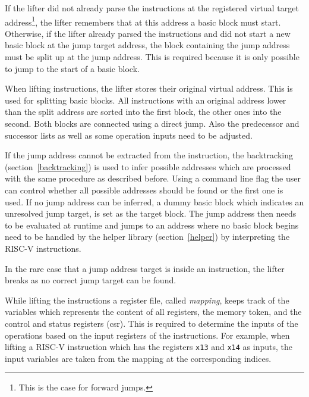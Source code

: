 \documentclass[course=eragp]{aspdoc}
\begin{document}
If the lifter did not already parse the instructions at the registered virtual target
address\footnote{This is the case for forward jumps.}, the
lifter remembers that at this address a basic block must start.
Otherwise, if the lifter already parsed the instructions and did not start a new basic block at the
jump target address, the block containing the jump address must be split up at the jump address.
This is required because it is only possible to jump to the start of a basic block.

\par

When lifting instructions, the lifter stores their original virtual address. This is used for
splitting basic blocks. All instructions with an original address lower than the split address are
sorted into the first block, the other ones into the second. Both blocks are connected using a
direct jump. Also the predecessor and successor lists as well as some operation inputs need to be
adjusted.

\par

If the jump address cannot be extracted from the instruction, the backtracking (section~\ref{backtracking})
is used to infer possible addresses which are processed with the same procedure as described before.
Using a command line flag the user can control whether all possible
addresses should be found or the first one is used. If no jump address can be inferred, a dummy
basic block which indicates an unresolved jump target, is set as the target block. The jump address then
needs to be evaluated at runtime and jumps to an address where no basic block begins need to be
handled by the helper library (section~\ref{helper}) by interpreting the RISC-V instructions.

\par

In the rare case that a jump address target is inside an instruction, the lifter breaks as no
correct jump target can be found.

\par

While lifting the instructions a register file, called \emph{mapping}, keeps track of the variables
which represents the content of all registers, the memory token, and the control and status registers
(csr). This is required to determine the inputs of the operations based on the input registers of
the instructions. For example, when lifting a RISC-V instruction which has the registers \texttt{x13}
and \texttt{x14} as inputs, the input variables are taken from the mapping at the corresponding
indices.
\end{document}
